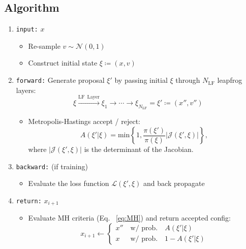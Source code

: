\documentclass[a4paper,11pt]{article}
\begin{document}
\subsection{\label{subsec:algorithm}Algorithm}
\begin{enumerate}
    \item \texttt{input:} $x$
    \begin{itemize}
        \item Re-sample $v \sim \mathcal{N}(0, 1)$
        \item Construct initial state $\xi \coloneqq (x, v)$
    \end{itemize}
    \item \texttt{forward:} Generate proposal $\xi'$ by passing initial $\xi$
      through $N_{\mathrm{LF}}$ leapfrog layers:
    \begin{equation}
        \xi \xrightarrow[]{\mathrm{LF\,\,\, Layer}} \xi_{1} \rightarrow \cdots \rightarrow \xi_{N_{\mathrm{LF}}} = \xi' \coloneqq (x'', v'')
    \end{equation}
    \begin{itemize}
        \item Metropolis-Hastings accept / reject:
        \begin{equation}
            A(\xi'|\xi) = \mathrm{min}\left\{1, \frac{\pi(\xi')}{\pi(\xi)} \left|\mathcal{J}\left(\xi', \xi\right)\right|\right\},
            \label{eq:MH}
        \end{equation}
        where $\left|\mathcal{J}(\xi',\xi)\right|$ is the determinant of the
        Jacobian.
    \end{itemize}
    \item \texttt{backward:} (if training)
    \begin{itemize}
        \item Evaluate the loss function $\mathcal{L}(\xi', \xi)$ and back
          propagate
    \end{itemize}
    \item \texttt{return:} $x_{i+1}$
    \begin{itemize}
        \item Evaluate MH criteria (Eq. ~\ref{eq:MH}) and return accepted
          config:
        \begin{equation}
            x_{i+1} \gets \begin{cases}
                x'' \quad \text{w/ prob.}\quad A(\xi'|\xi)  \\
                x \,\,\,\quad \text{w/ prob.} \quad 1 - A(\xi'|\xi)
            \end{cases}
        \end{equation}
    \end{itemize}
\end{enumerate}
%
\end{document}
